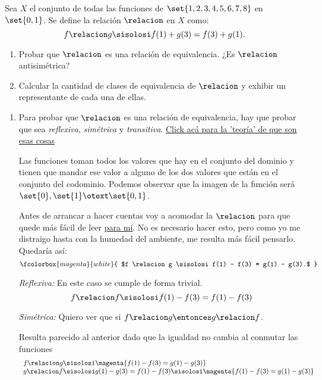 \begin{enunciado}{\ejExtra}
  Sea $X$ el conjunto de todas las funciones de $\set{1,2,3,4,5,6,7,8}$ en $\set{0,1}$. Se define la relación $\relacion$ en $X$ como:
  $$
    f \relacion g \sisolosi f(1) + g(3) = f(3) + g(1).
  $$
  \begin{enumerate}[label=\alph*)]
    \item Probar que $\relacion$ es una relación de equivalencia. ¿Es $\relacion$ antisimétrica?
    \item Calcular la cantidad de clases de equivalencia de $\relacion$ y exhibir un representante de cada una de ellas.
  \end{enumerate}
\end{enunciado}

\begin{enumerate}[label=\alph*)]
  \item
        Para probar que $\relacion$ es una relación de equivalencia, hay que probar que sea \textit{reflexiva}, \textit{simétrica} y \textit{transitiva}.
        \hyperlink{teoria-1:prop-relaciones}{Click acá para la 'teoría' de que son esas cosas}\par

        \bigskip

        Las funciones toman todos los valores que hay en el conjunto del dominio y tienen que mandar ese valor a alguno de los dos valores que están
        en el conjunto del codominio. Podemos observar que la imagen de la función será $\set{0}, \set{1} \otext \set{0,1}$.

        Antes de arrancar a hacer cuentas voy a acomodar la $\relacion$ para que quede más fácil de leer \underline{para mí}.
        No es necesario hacer esto, pero como yo me distraigo hasta con la humedad del ambiente, me resulta más fácil pensarlo. Quedaría así:
        $$
          \fcolorbox{magenta}{white}{
            $f \relacion g \sisolosi f(1) - f(3) = g(1) - g(3).$
          }
        $$

        \textit{Reflexiva:} En este caso se cumple de forma trivial.
        $$
          f \relacion f \sisolosi f(1) - f(3) = f(1) - f(3)
        $$

        \textit{Simétrica:}
        Quiero ver que si $f \relacion g \entonces g \relacion f$.\par Resulta parecido al anterior dado que la igualdad no cambia al conmutar las funciones
        $$
          \begin{array}{l}
            f \relacion g \sisolosi \magenta{f(1) - f(3) = g(1) - g(3)} \\
            g \relacion f \sisolosi g(1) - g(3) = f(1) - f(3) \sisolosi \magenta{f(1) - f(3) = g(1) - g(3)}
          \end{array}
        $$


\end{enumerate}
